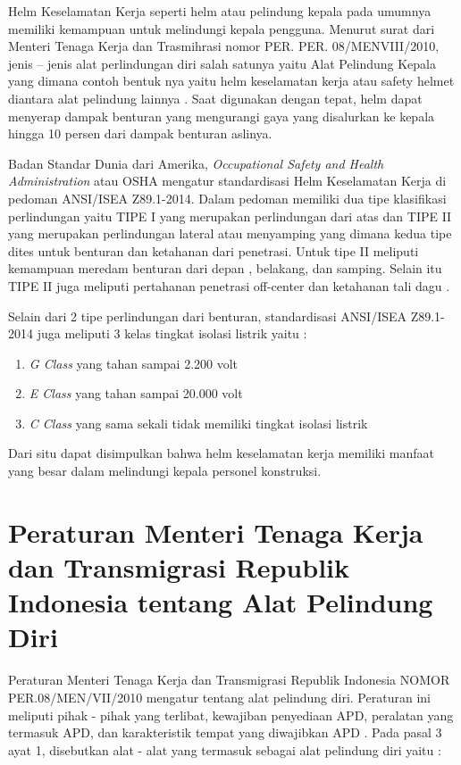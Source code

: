 Helm Keselamatan Kerja seperti helm atau pelindung kepala pada umumnya memiliki kemampuan untuk 
melindungi kepala pengguna. Menurut surat dari Menteri Tenaga Kerja dan Trasmihrasi nomor PER. PER. 08/MENVIII/2010, 
jenis – jenis alat perlindungan diri salah satunya yaitu Alat Pelindung Kepala yang dimana contoh bentuk
nya yaitu helm keselamatan kerja atau safety helmet diantara alat pelindung lainnya \cite{suratkementriantenagakerja}. 
Saat digunakan dengan tepat, helm dapat menyerap dampak benturan yang mengurangi gaya yang disalurkan ke kepala hingga 10 persen dari dampak benturan aslinya. \cite{kim2018safety}

Badan Standar Dunia dari Amerika, \emph{Occupational Safety and Health Administration} atau OSHA mengatur 
standardisasi Helm Keselamatan Kerja di pedoman ANSI/ISEA Z89.1-2014. Dalam pedoman memiliki dua tipe 
klasifikasi perlindungan yaitu TIPE I yang merupakan perlindungan dari atas dan TIPE II yang merupakan 
perlindungan lateral atau menyamping yang dimana kedua tipe dites untuk benturan dan ketahanan dari 
penetrasi. Untuk tipe II meliputi kemampuan meredam benturan dari depan , belakang, dan samping. 
Selain itu TIPE II juga meliputi pertahanan penetrasi off-center dan ketahanan tali dagu \cite{american1997american}.

Selain dari 2 tipe perlindungan dari benturan, standardisasi ANSI/ISEA Z89.1-2014 juga meliputi 3 kelas tingkat isolasi listrik yaitu \cite{american1997american}:
\begin{enumerate}
    \item \emph{G Class} yang tahan sampai 2.200 volt
    \item \emph{E Class} yang tahan sampai 20.000 volt
    \item \emph{C Class} yang sama sekali tidak memiliki tingkat isolasi listrik
\end{enumerate}

Dari situ dapat disimpulkan bahwa helm keselamatan kerja memiliki manfaat yang besar dalam melindungi kepala personel konstruksi.

\section{Peraturan Menteri Tenaga Kerja dan Transmigrasi Republik Indonesia tentang Alat Pelindung Diri}
\label{sec:peraturanapd}

\par Peraturan Menteri Tenaga Kerja dan Transmigrasi Republik Indonesia NOMOR PER.08/MEN/VII/2010 mengatur tentang alat pelindung diri.
Peraturan ini meliputi pihak - pihak yang terlibat, kewajiban penyediaan APD, peralatan yang termasuk APD, dan karakteristik tempat
yang diwajibkan APD \cite{suratkementriantenagakerja}. Pada pasal 3 ayat 1, disebutkan alat - alat yang termasuk sebagai alat pelindung diri
yaitu :

